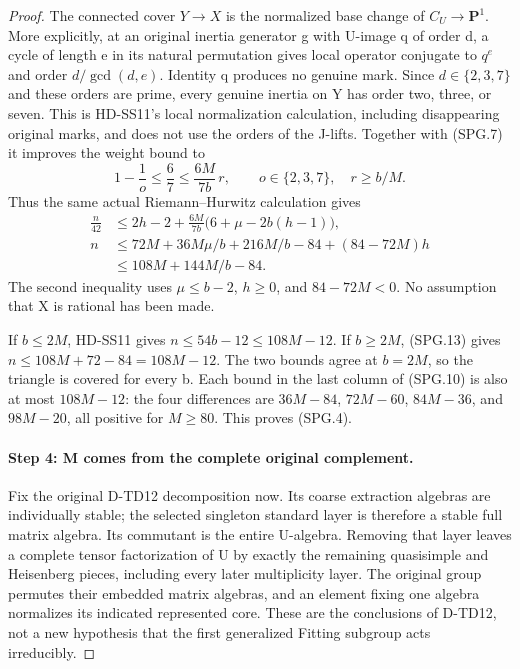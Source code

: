 \begin{proof}
The connected cover \(Y\to X\) is the normalized base change
of \(C_U\to\mathbf P^1\).  More explicitly, at an original
inertia generator g with U-image q of order d, a cycle of length e
in its natural permutation gives local operator conjugate to \(q^e\)
and order \(d/\gcd(d,e)\).  Identity q produces no genuine mark.
Since \(d\in\{2,3,7\}\) and these orders are prime, every
genuine inertia on Y has order two, three, or seven.  This is
HD-SS11's local normalization calculation, including disappearing
original marks, and does not use the orders of the J-lifts.
Together with (SPG.7) it improves the weight bound to
\[
          1-\frac1o\le\frac67\le\frac{6M}{7b}\,r,
 \qquad o\in\{2,3,7\},\quad r\ge b/M.
 \tag{SPG.12}
\]
Thus the same actual Riemann--Hurwitz calculation gives
\[
 \begin{split}
 \frac n{42}
 &\le2h-2+\frac{6M}{7b}\bigl(6+\mu-2b(h-1)\bigr),\\
 n&\le72M+36M\mu/b+216M/b-84+(84-72M)h\\
  &\le108M+144M/b-84.
 \end{split}
 \tag{SPG.13}
\]
The second inequality uses \(\mu\le b-2\), \(h\ge0\), and
\(84-72M<0\).  No assumption that X is rational has been made.

If \(b\le2M\), HD-SS11 gives \(n\le54b-12\le108M-12\).
If \(b\ge2M\), (SPG.13) gives
\(n\le108M+72-84=108M-12\).  The two bounds agree at
\(b=2M\), so the triangle is covered for every b.  Each bound
in the last column of (SPG.10) is also at most \(108M-12\):
the four differences are \(36M-84\), \(72M-60\),
\(84M-36\), and \(98M-20\), all positive for \(M\ge80\).
This proves (SPG.4).

\paragraph{Step 4: M comes from the complete original complement.}
Fix the original D-TD12 decomposition now.  Its coarse extraction
algebras are individually stable; the selected singleton standard
layer is therefore a stable full matrix algebra.  Its commutant
is the entire U-algebra.  Removing that layer leaves a complete
tensor factorization of U by exactly the remaining quasisimple and
Heisenberg pieces, including every later multiplicity layer.
The original group permutes their embedded matrix algebras, and
an element fixing one algebra normalizes its indicated represented core.
These are the conclusions of D-TD12, not a new hypothesis that the
first generalized Fitting subgroup acts irreducibly.


\end{proof}
